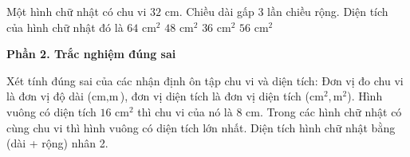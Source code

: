 \begin{ex} %
Một hình chữ nhật có chu vi $32\text{ cm}$. Chiều dài gấp 3 lần chiều rộng. Diện tích của hình chữ nhật đó là
\choice
{$64\text{ cm}^2$}
{\True $48\text{ cm}^2$}
{$36\text{ cm}^2$}
{$56\text{ cm}^2$}
\end{ex}

\textbf{Phần 2. Trắc nghiệm đúng sai}

\begin{ex} %
Xét tính đúng sai của các nhận định ôn tập chu vi và diện tích:
\choiceTF
{\True Đơn vị đo chu vi là đơn vị độ dài ($\text{cm}, \text{m}$), đơn vị diện tích là đơn vị diện tích ($\text{cm}^2, \text{m}^2$).}
{Hình vuông có diện tích $16\text{ cm}^2$ thì chu vi của nó là $8\text{ cm}$.}
{\True Trong các hình chữ nhật có cùng chu vi thì hình vuông có diện tích lớn nhất.}
{Diện tích hình chữ nhật bằng (dài + rộng) nhân 2.}
\end{ex}

